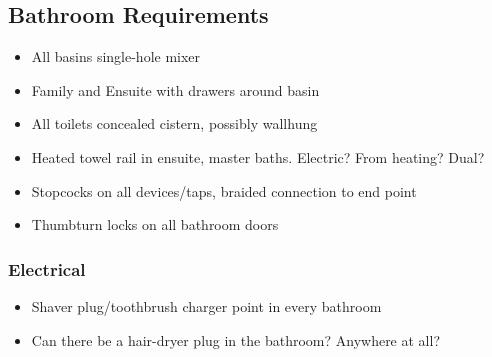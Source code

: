 \subsection{Bathroom Requirements}
\begin{itemize}
\item All basins single-hole mixer
\item Family and Ensuite with drawers around basin
\item All toilets concealed cistern, possibly wallhung
\item Heated towel rail in ensuite, master baths. Electric? From heating? Dual?
\item Stopcocks on all devices/taps, braided connection to end point
\item Thumbturn locks on all bathroom doors
\end{itemize}

\subsubsection{Electrical}
\begin{itemize}
\item Shaver plug/toothbrush charger point in every bathroom
\item Can there be a hair-dryer plug in the bathroom? Anywhere at all?
\end{itemize}

